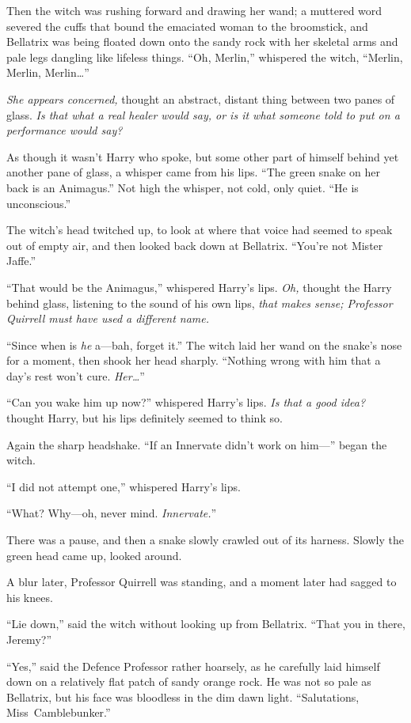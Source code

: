 Then the witch was rushing forward and drawing her wand; a muttered word
severed the cuffs that bound the emaciated woman to the broomstick, and
Bellatrix was being floated down onto the sandy rock with her skeletal arms and
pale legs dangling like lifeless things. “Oh, Merlin,” whispered the witch,
“Merlin, Merlin, Merlin…”

\emph{She appears concerned,} thought an abstract, distant thing between two
panes of glass. \emph{Is that what a real healer would say, or is it what
someone told to put on a performance would say?}

As though it wasn’t Harry who spoke, but some other part of himself behind yet
another pane of glass, a whisper came from his lips. “The green snake on her
back is an Animagus.” Not high the whisper, not cold, only quiet. “He is
unconscious.”

The witch’s head twitched up, to look at where that voice had seemed to speak
out of empty air, and then looked back down at Bellatrix. “You’re not Mister
Jaffe.”

“That would be the Animagus,” whispered Harry’s lips. \emph{Oh,} thought the
Harry behind glass, listening to the sound of his own lips, \emph{that makes
sense; Professor Quirrell must have used a different name.}

“Since when is \emph{he} a—bah, forget it.” The witch laid her wand on the
snake’s nose for a moment, then shook her head sharply. “Nothing wrong with him
that a day’s rest won’t cure. \emph{Her…}”

“Can you wake him up now?” whispered Harry’s lips. \emph{Is that a good idea?}
thought Harry, but his lips definitely seemed to think so.

Again the sharp headshake. “If an Innervate didn’t work on him—” began the
witch.

“I did not attempt one,” whispered Harry’s lips.

“What? Why—oh, never mind. \emph{Innervate.}”

There was a pause, and then a snake slowly crawled out of its harness. Slowly
the green head came up, looked around.

A blur later, Professor Quirrell was standing, and a moment later had sagged to
his knees.

“Lie down,” said the witch without looking up from Bellatrix. “That you in
there, Jeremy?”

“Yes,” said the Defence Professor rather hoarsely, as he carefully laid himself
down on a relatively flat patch of sandy orange rock. He was not so pale as
Bellatrix, but his face was bloodless in the dim dawn light. “Salutations,
Miss~Camblebunker.”

